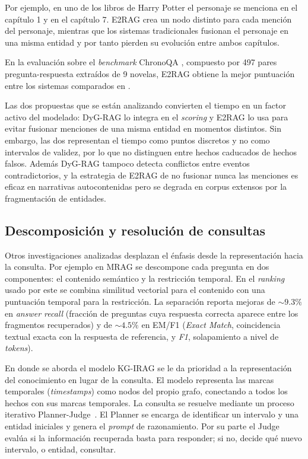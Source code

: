 Por ejemplo, en uno de los libros de Harry Potter el personaje se menciona en el capítulo 1 y en el capítulo 7. E2RAG crea un nodo distinto para cada mención del personaje, mientras que los sistemas tradicionales fusionan el personaje en una misma entidad y por tanto pierden su evolución entre ambos capítulos.

En la evaluación sobre el \emph{benchmark} ChronoQA \cite{chronoqa_placeholder}, compuesto por 497 pares pregunta-respuesta extraídos de 9 novelas, E2RAG obtiene la mejor puntuación entre los sistemas comparados en \cite{e2rag2025} .

Las dos propuestas que se están analizando convierten el tiempo en un factor activo del modelado: DyG-RAG lo integra en el \emph{scoring} y E2RAG lo usa para evitar fusionar menciones de una misma entidad en momentos distintos. Sin embargo, las dos representan el tiempo como puntos discretos y no como intervalos de validez, por lo que no distinguen entre hechos caducados de hechos falsos. Además DyG-RAG tampoco detecta conflictos entre eventos contradictorios, y la estrategia de E2RAG de no fusionar nunca las menciones es eficaz en narrativas autocontenidas pero se degrada en corpus extensos por la fragmentación de entidades.

\subsection{Descomposición y resolución de consultas}

Otros investigaciones analizadas desplazan el énfasis desde la representación hacia la consulta. Por ejemplo en MRAG \cite{mrag2025} se descompone cada pregunta en dos componentes: el contenido semántico y la restricción temporal. En el \emph{ranking} usado por este se combina similitud vectorial para el contenido con una puntuación temporal para la restricción. La separación reporta mejoras de ${\sim}9.3\%$ en \emph{answer recall} (fracción de preguntas cuya respuesta correcta aparece entre los fragmentos recuperados) y de ${\sim}4.5\%$ en EM/F1 (\emph{Exact Match}, coincidencia textual exacta con la respuesta de referencia, y \emph{F1}, solapamiento a nivel de \emph{tokens}).

En \cite{kg_irag2025} donde se aborda el modelo KG-IRAG se le da prioridad a la representación del conocimiento en lugar de la consulta. El modelo representa las marcas temporales (\emph{timestamps}) como nodos del propio grafo, conectando a todos los hechos con sus marcas temporales. La consulta se resuelve mediante un proceso iterativo Planner-Judge~\cite{kg_irag2025}. El Planner se encarga de identificar un intervalo y una entidad iniciales y genera el \emph{prompt} de razonamiento. Por su parte el Judge evalúa si la información recuperada basta para responder; si no, decide qué nuevo intervalo, o entidad, consultar.

